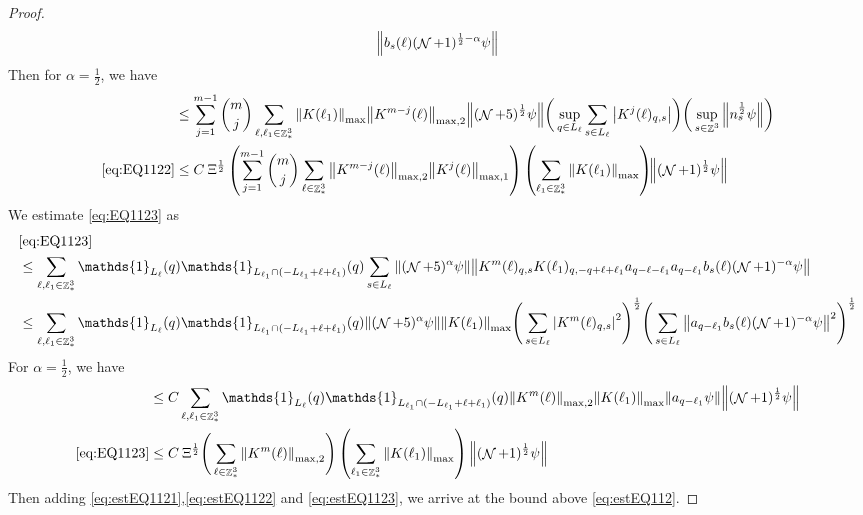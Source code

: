\documentclass[sn-mathphys, Numbered ,a4paper]{sn-jnl}%
\DeclareMathOperator{\Z}{\mathbb{Z}}
\DeclareMathOperator{\NN}{\mathcal{N}}
\newcommand{\half}{\frac{1}{2}}
\theoremstyle{plain}
\theoremstyle{definition}
\theoremstyle{remark}
\theoremstyle{plain}
\theoremstyle{definition}
\theoremstyle{remark}
\begin{document}
\begin{proof}
\begin{alignat}{2}
		\norm{  b_{s}(\ell)  (\NN+1)^{\half-\alpha} \psi }		
	\nonumber\\
\end{alignat}
Then for $\alpha = \half$, we have
\begin{align}
	&\leq  \sum\limits_{j=1}^{m-1} {{m}\choose j}\sum\limits_{\ell, \ell_1\in \Z^3_*}  \norm{K(\ell_1)}_{\mathrm{max}} \norm{K^{m-j}(\ell)}_{\mathrm{max,2}} \norm{ (\NN+5)^{\half} \psi} \bigg(\sup_{q \in L_{\ell}}\sum\limits_{s\in L_{\ell}}\abs{K^{j}(\ell)_{q,s}}\bigg) \bigg(
	\sup_{s \in \Z^3}\norm{  n_s^\half   \psi } \bigg)\nonumber\\
	\eqref{eq:EQ1122}&\leq C \: \Xi^\half \left(  \sum\limits_{j=1}^{m-1} {{m}\choose j} \sum\limits_{\ell \in \Z^3_*} \norm{K^{m-j}(\ell)}_{\mathrm{max,2}} \norm{ K^{j}(\ell)}_{\mathrm{max,1}}\right) \left( \sum\limits_{ \ell_1\in \Z^3_*}\norm{ K(\ell_1) }_{\mathrm{max}} \right)\!\! \norm{(\NN+1)^\half \psi } \label{eq:estEQ1122}
\end{align}
We estimate \eqref{eq:EQ1123} as 
\begin{align}
	&\eqref{eq:EQ1123}\nonumber\\
	&\leq\sum\limits_{\ell, \ell_1\in \Z^3_*} \mathds{1}_{L_{\ell}}(q) \mathds{1}_{L_{\ell_1}\cap(-L_{\ell_1}+\ell+\ell_1)}(q) \sum\limits_{s \in L_{\ell}} \norm{(\NN+5)^{\alpha} \psi}\norm{ K^m(\ell)_{q,s} K(\ell_1)_{q,-q+\ell+\ell_1} a_{q-\ell-\ell_1} a_{q-\ell_1} b_{s}(\ell) (\NN+1)^{-\alpha} \psi }\nonumber\nonumber\\
	&\leq\sum\limits_{\ell, \ell_1\in \Z^3_*} \mathds{1}_{L_{\ell}}(q) \mathds{1}_{L_{\ell_1}\cap(-L_{\ell_1}+\ell+\ell_1)}(q)\norm{(\NN+5)^{\alpha} \psi} \norm{K(\ell_1)}_{\mathrm{max}} \Bigg( \sum\limits_{s \in L_{\ell}} \abs{K^m(\ell)_{q,s}}^2\Bigg)^\half \Bigg(\sum\limits_{s \in L_{\ell}} \norm{ a_{q-\ell_1} b_s(\ell) (\NN+1)^{-\alpha} \psi  }^2\Bigg)^\half \nonumber\\
\end{align}
For $\alpha=\half$, we have
\begin{align}
	&\leq C\sum\limits_{\ell, \ell_1\in \Z^3_*} \mathds{1}_{L_{\ell}}(q) \mathds{1}_{L_{\ell_1}\cap(-L_{\ell_1}+\ell+\ell_1)}(q) \norm{K^m(\ell)}_{\mathrm{max,2}} \norm{K(\ell_1)}_{\mathrm{max}} \norm{a_{q-\ell_1} \psi } \norm{(\NN+1)^\half \psi}\nonumber\\
	\eqref{eq:EQ1123}&\leq C\: \Xi^\half   \Bigg( \sum\limits_{\ell\in \Z^3_*} \norm{K^m(\ell)}_{\mathrm{max,2}}\Bigg) \left(\sum\limits_{ \ell_1\in \Z^3_*} \norm{K(\ell_1)}_{\mathrm{max}} \right)  \norm{(\NN+1)^\half \psi}\label{eq:estEQ1123}
\end{align}
Then adding \eqref{eq:estEQ1121},\eqref{eq:estEQ1122} and \eqref{eq:estEQ1123}, we arrive at the bound above \eqref{eq:estEQ112}.
\end{proof}
\end{document}
